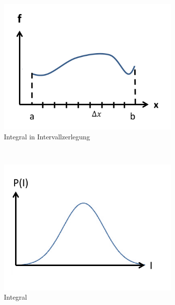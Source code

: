 \documentclass[12pt]{article}
\begin{document}
\begin{figure}[h] 
		\begin{subfigure}[h]{0.5 \textwidth}
		\centering
		\includegraphics[width=\textwidth]{Folie15.png}
		\caption{Integral in Intervallzerlegung} 
		\label{fig:Intervall}
		\centering
	\end{subfigure}
	~
	\begin{subfigure}[h]{0.5\textwidth}
		\centering
		\includegraphics[width=\textwidth]{Folie16.png}
		\caption{Integral} 
		\label{fig:Integralwert}
		\centering
	\end{subfigure}
	\caption{ }
\end{figure}
\end{document}
